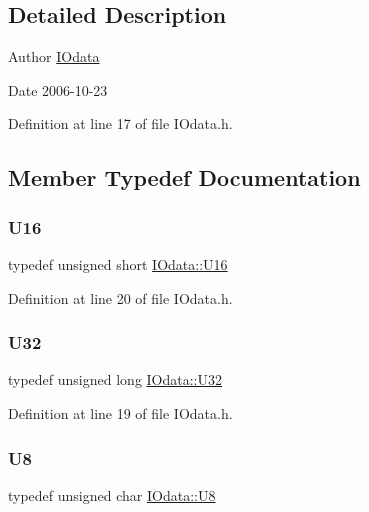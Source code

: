 \subsection{Detailed Description}
\begin{DoxyAuthor}{Author}
\hyperlink{classIOdata}{I\+Odata} 
\end{DoxyAuthor}
\begin{DoxyDate}{Date}
2006-\/10-\/23 
\end{DoxyDate}


Definition at line 17 of file I\+Odata.\+h.



\subsection{Member Typedef Documentation}
\mbox{\label{classIOdata_a1eb45b348534a7c19a4a99b746e693ff}} 
\subsubsection{\texorpdfstring{U16}{U16}}
{\footnotesize\ttfamily typedef unsigned short \hyperlink{classIOdata_a1eb45b348534a7c19a4a99b746e693ff}{I\+Odata\+::\+U16}}



Definition at line 20 of file I\+Odata.\+h.

\mbox{\label{classIOdata_a96fb57f5fcd87b708743abd3c86a5198}} 
\subsubsection{\texorpdfstring{U32}{U32}}
{\footnotesize\ttfamily typedef unsigned long \hyperlink{classIOdata_a96fb57f5fcd87b708743abd3c86a5198}{I\+Odata\+::\+U32}}



Definition at line 19 of file I\+Odata.\+h.

\mbox{\label{classIOdata_a18d1354b7cdaf0f8a8001fdbb3ced418}} 
\subsubsection{\texorpdfstring{U8}{U8}}
{\footnotesize\ttfamily typedef unsigned char \hyperlink{classIOdata_a18d1354b7cdaf0f8a8001fdbb3ced418}{I\+Odata\+::\+U8}}



